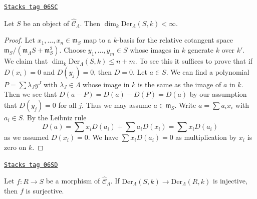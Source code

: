 \begin{lemma}
\label{formal-defos-lemma-derivations-finite}
\href{https://stacks.math.columbia.edu/tag/06SC}{\texttt{Stacks tag 06SC}}

Let $S$ be an object of $\widehat{\mathcal{C}}_\Lambda$.
Then $\dim_k \text{Der}_\Lambda(S, k) < \infty$.
\end{lemma}

\begin{proof}
Let $x_1, \ldots, x_n \in \mathfrak m_S$ map to a $k$-basis
for the relative cotangent space
$\mathfrak m_S/(\mathfrak m_\Lambda S + \mathfrak m_S^2)$.
Choose $y_1, \ldots, y_m \in S$ whose images in $k$ generate $k$
over $k'$. We claim that $\dim_k \text{Der}_\Lambda(S, k) \leq n + m$.
To see this it suffices to prove that if $D(x_i) = 0$ and
$D(y_j) = 0$, then $D = 0$. Let $a \in S$. We can find a
polynomial $P = \sum \lambda_J y^J$ with $\lambda_J \in \Lambda$
whose image in $k$ is the same as the image of $a$ in $k$.
Then we see that $D(a - P) = D(a) - D(P) = D(a)$ by our assumption
that $D(y_j) = 0$ for all $j$. Thus we may assume $a \in \mathfrak m_S$.
Write $a = \sum a_i x_i$ with $a_i \in S$. By the Leibniz rule
$$
D(a) = \sum x_iD(a_i) + \sum a_iD(x_i) = \sum x_iD(a_i)
$$
as we assumed $D(x_i) = 0$. We have $\sum x_iD(a_i) = 0$
as multiplication by $x_i$ is zero on $k$.
\end{proof}

\begin{lemma}
\label{formal-defos-lemma-derivations-surjective}
\href{https://stacks.math.columbia.edu/tag/06SD}{\texttt{Stacks tag 06SD}}

Let $f : R \to S$ be a morphism of $\widehat{\mathcal{C}}_\Lambda$.
If $\text{Der}_\Lambda(S, k) \to \text{Der}_\Lambda(R, k)$ is injective,
then $f$ is surjective.
\end{lemma}

